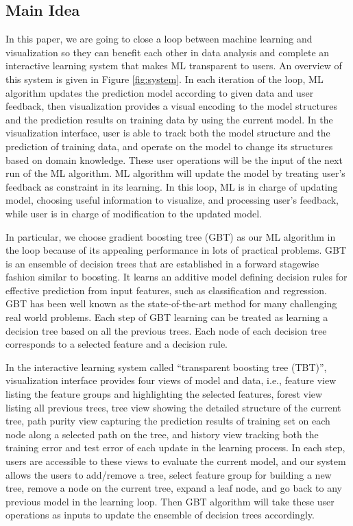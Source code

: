 \documentclass{chi2009}
\begin{document}
\subsection{Main Idea}

In this paper, we are going to close a loop between machine learning and visualization so they can benefit each other in data analysis and complete an interactive learning system that makes ML transparent to users. An overview of this system is given in Figure \ref{fig:system}. In each iteration of the loop, ML algorithm updates the prediction model according to given data and user feedback, then visualization provides a visual encoding to the model structures and the prediction results on training data by using the current model. In the visualization interface, user is able to track both the model structure and the prediction of training data, and operate on the model
to change its structures based on domain knowledge. These user operations will be the input of the next run of the ML algorithm. ML algorithm will update the model by treating user's feedback as constraint in its learning. In this loop, ML is in charge of updating model, choosing useful information to visualize, and processing user's feedback, while user is in charge of modification to the updated model. 

In particular, we choose gradient boosting tree (GBT) \cite{GBRT} as our ML algorithm in the loop because of its appealing performance in lots of practical problems. GBT is an ensemble of decision trees that are established in a forward stagewise fashion similar to boosting. It learns an additive model defining  decision rules for effective prediction from input features, such as classification and regression. GBT has been well known as the state-of-the-art method for many challenging real world problems. Each step of GBT learning can be treated as learning a decision tree based on all the previous trees. Each node of each decision tree corresponds to a selected feature and a decision rule. 

In the interactive learning system called ``transparent boosting tree (TBT)'', visualization interface provides four views of model and data, i.e., feature view listing the feature groups and highlighting the selected features, forest view listing all previous trees, tree view showing the detailed structure of the current tree, path purity view capturing the prediction results of training set on each node along a selected path on the tree, and history view tracking both the training error and test error of each update in the learning process. In each step, users are accessible to these views to evaluate the current model, and our system allows the users to add/remove a tree, select feature group for building a new tree, remove a node on the current tree, expand a leaf node, and go back to any previous model in the learning loop. Then GBT algorithm will take these user operations as inputs to update the ensemble of decision trees accordingly. 
\end{document}
